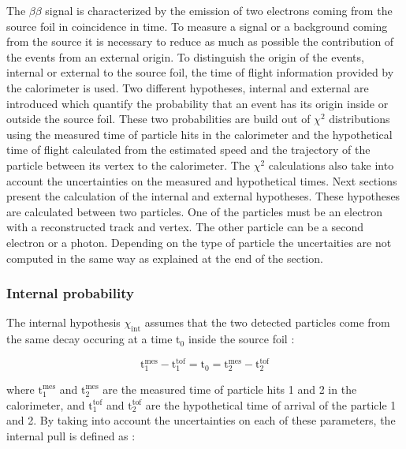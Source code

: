 \documentclass[main.tex]{subfiles}
\begin{document}
\NI The $\beta\beta$ signal is characterized by the emission of two electrons coming from the source foil in coincidence in time. To measure a signal or a background coming from the source it is necessary to reduce as much as possible the contribution of the events from an external origin. To distinguish the origin of the events, internal or external to the source foil, the time of flight information provided by the calorimeter is used. Two different hypotheses, internal and external are introduced which quantify the probability that an event has its origin inside or outside the source foil. These two probabilities are build out of $\chi^\text{2}$ distributions using the measured time of particle hits in the calorimeter and the hypothetical time of flight calculated from the estimated speed and the trajectory of the particle between its vertex to the calorimeter. The $\chi^\text{2}$ calculations also take into account the uncertainties on the measured and hypothetical times. Next sections present the calculation of the internal and external hypotheses. These hypotheses are calculated between two particles. One of the particles must be an electron with a reconstructed track and vertex.  The other particle can be a second electron or a photon. Depending on the type of particle the uncertaities are not computed in the same way as explained at the end of the section.


\subsubsection{Internal probability}\label{sec:Pint}


\NI The internal hypothesis $\chi_{\text{int}}$ assumes that the two detected particles come from the same decay occuring at a time t$_\text{0}$ inside the source foil :


\begin{equation}
\text{t}_\text{1}^{\text{mes}} - \text{t}_\text{1}^{\text{tof}} = \text{t}_\text{0} = \text{t}_\text{2}^{\text{mes}} - \text{t}_\text{2}^{\text{tof}}  
\end{equation}


\NI where $\text{t}_\text{1}^{\text{mes}}$ and $\text{t}_\text{2}^{\text{mes}}$ are the measured time of particle hits 1 and 2 in the calorimeter, and $\text{t}_\text{1}^{\text{tof}}$ and $\text{t}_\text{2}^{\text{tof}}$ are the hypothetical time of arrival of the particle 1 and 2. By taking into account the uncertainties on each of these parameters, the internal pull is defined as :
\end{document}
